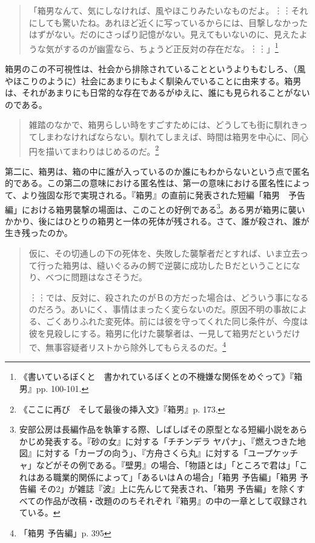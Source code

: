 \documentclass[b5j,twoside,twocolumn]{utarticle}
\begin{document}
\begin{quotation}
「箱男なんて、気にしなければ、風やほこりみたいなものだよ。︙︙それにしても驚いたね。あれほど近くに写っているからには、目撃しなかったはずがない。だのにさっぱり記憶がない。見えてもいないのに、見えたような気がするのが幽霊なら、ちょうど正反対の存在だな。︙︙」\footnote{《書いているぼくと　書かれているぼくとの不機嫌な関係をめぐって》『箱男』pp. 100-101.}	
\end{quotation}

箱男のこの不可視性は、社会から排除されていることというよりもむしろ、（風やほこりのように）社会にあまりにもよく馴染んでいることに由来する。箱男は、それがあまりにも日常的な存在であるがゆえに、誰にも見られることがないのである。

\begin{quotation}
雑踏のなかで、箱男らしい時をすごすためには、どうしても街に馴れきってしまわなければならない。馴れてしまえば、時間は箱男を中心に、同心円を描いてまわりはじめるのだ。\footnote{《ここに再び　そして最後の挿入文》『箱男』p. 173.}
\end{quotation}

第二に、箱男は、箱の中に誰が入っているのか誰にもわからないという点で匿名的である。この第二の意味における匿名性は、第一の意味における匿名性によって、より強固な形で実現される。『箱男』の直前に発表された短編「箱男　予告編」における箱男襲撃の場面は、このことの好例である\footnote{安部公房は長編作品を執筆する際、しばしばその原型となる短編小説をあらかじめ発表する。『砂の女』に対する「チチンデラ ヤパナ」、『燃えつきた地図』に対する「カーブの向う」、『方舟さくら丸』に対する「ユープケッチャ」などがその例である。『壁男』の場合、「物語とは」「ところで君は」「これはある職業的関係によって」「あるいはＡの場合」「箱男 予告編」「箱男 予告編 その2」が雑誌『波』上に先んじて発表され、「箱男 予告編」を除くすべての作品が改稿・改題ののちそれぞれ『箱男』の中の一章として収録されている。}。ある男が箱男に襲いかかり、後にはひとりの箱男と一体の死体が残される。さて、誰が殺され、誰が生き残ったのか。

\begin{quotation}
仮に、その切通しの下の死体を、失敗した襲撃者だとすれば、いま立去って行った箱男は、縫いぐるみの鰐で逆襲に成功したＢだということになり、べつに問題はなさそうだ。

︙︙では、反対に、殺されたのがＢの方だった場合は、どういう事になるのだろう。あいにく、事情はまったく変らないのだ。原因不明の事故による、ごくありふれた変死体。前には彼を守ってくれた同じ条件が、今度は彼を見殺しにする。箱男に化けた襲撃者は、一見して箱男だというだけで、無事容疑者リストから除外してもらえるのだ。\footnote{「箱男 予告編」p. 395}
\end{quotation}
\end{document}
